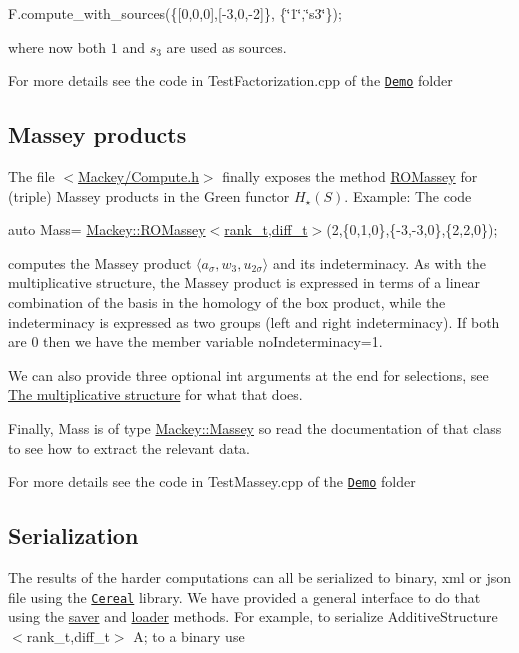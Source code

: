{\ttfamily F.\+compute\+\_\+with\+\_\+sources(\{\mbox{[}0,0,0\mbox{]},\mbox{[}-\/3,0,-\/2\mbox{]}\}, \{\char`\"{}1\char`\"{},\char`\"{}s3\char`\"{}\});}

where now both $1$ and $s_3$ are used as sources.

For more details see the code in Test\+Factorization.\+cpp of the \href{https://github.com/NickG-Math/Mackey/tree/master/Demo}{\tt Demo} folder\hypertarget{use_step1Mass}{}\subsection{Massey products}\label{use_step1Mass}
The file {\ttfamily $<$\hyperlink{Compute_8h}{Mackey/\+Compute.\+h}$>$} finally exposes the method \hyperlink{namespaceMackey_ab75d7bcfa2d92d01bea0d5eef9f48398}{R\+O\+Massey} for (triple) Massey products in the Green functor $H_{\star}(S)$. Example\+: The code

{\ttfamily auto Mass= \hyperlink{namespaceMackey_ab75d7bcfa2d92d01bea0d5eef9f48398}{Mackey\+::\+R\+O\+Massey$<$rank\+\_\+t,diff\+\_\+t$>$}(2,\{0,1,0\},\{-\/3,-\/3,0\},\{2,2,0\});}

computes the Massey product $\langle a_{\sigma},w_3,u_{2\sigma}\rangle $ and its indeterminacy. As with the multiplicative structure, the Massey product is expressed in terms of a linear combination of the basis in the homology of the box product, while the indeterminacy is expressed as two groups (left and right indeterminacy). If both are $0$ then we have the member variable {\ttfamily no\+Indeterminacy=1}.

We can also provide three optional {\ttfamily int} arguments at the end for selections, see \hyperlink{use_step1mult}{The multiplicative structure} for what that does.

Finally, {\ttfamily Mass} is of type {\ttfamily \hyperlink{classMackey_1_1Massey}{Mackey\+::\+Massey}} so read the documentation of that class to see how to extract the relevant data.

For more details see the code in Test\+Massey.\+cpp of the \href{https://github.com/NickG-Math/Mackey/tree/master/Demo}{\tt Demo} folder\hypertarget{use_step1Cer}{}\subsection{Serialization}\label{use_step1Cer}
The results of the harder computations can all be serialized to binary, xml or json file using the \href{https://uscilab.github.io/cereal}{\tt Cereal} library. We have provided a general interface to do that using the \hyperlink{namespaceMackey_a1824d780ce15f1845e4f87bf056feec9}{saver} and \hyperlink{namespaceMackey_a735958355cdca12e0d312b7e604f28bc}{loader} methods. For example, to serialize {\ttfamily Additive\+Structure$<$rank\+\_\+t,diff\+\_\+t$>$ A;} to a binary use

